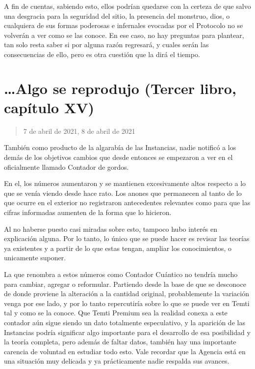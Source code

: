 \documentclass[
]{book}
\begin{document}
A fin de cuentas, sabiendo esto, ellos podrían quedarse con la certeza de que salvo una desgracia para la seguridad del sitio, la presencia del monstruo, dios, o cualquiera de sus formas poderosas e infernales evocadas por el Protocolo no se volverán a ver como se las conoce. En ese caso, no hay preguntas para plantear, tan solo resta saber si por alguna razón regresará, y cuales serán las consecuencias de ello, pero es otra cuestión que la dirá el tiempo.

\hypertarget{algo-se-reprodujo-tercer-libro-capuxedtulo-xv}{%
\section{\ldots Algo se reprodujo (Tercer libro, capítulo XV)}\label{algo-se-reprodujo-tercer-libro-capuxedtulo-xv}}

\begin{quote}
7 de abril de 2021, 8 de abril de 2021
\end{quote}

También como producto de la algarabía de las Instancias, nadie notificó a los demás de los objetivos cambios que desde entonces se empezaron a ver en el oficialmente llamado Contador de gordos.

En el, los números aumentaron y se mantienen excesivamente altos respecto a lo que se venía viendo desde hace rato. Los anones que permanecen al tanto de lo que ocurre en el exterior no registraron antecedentes relevantes como para que las cifras informadas aumenten de la forma que lo hicieron.

Al no haberse puesto casi miradas sobre esto, tampoco hubo interés en explicación alguna. Por lo tanto, lo único que se puede hacer es revisar las teorías ya existentes y a partir de lo que estas tengan, ampliar los conocimientos, o unicamente suponer.

La que renombra a estos números como Contador Cuántico no tendría mucho para cambiar, agregar o reformular. Partiendo desde la base de que se desconoce de donde proviene la alteración a la cantidad original, probablemente la variación venga por ese lado, y por lo tanto repercutiría sobre lo que se puede ver en Temti tal y como se la conoce. Que Temti Premium sea la realidad conexa a este contador aún sigue siendo un dato totalmente especulativo, y la aparición de las Instancias podría significar algo importante para el desarrollo de esa posibilidad y la teoría completa, pero además de faltar datos, también hay una importante carencia de voluntad en estudiar todo esto. Vale recordar que la Agencia está en una situación muy delicada y ya prácticamente nadie respalda sus avances.
\end{document}
